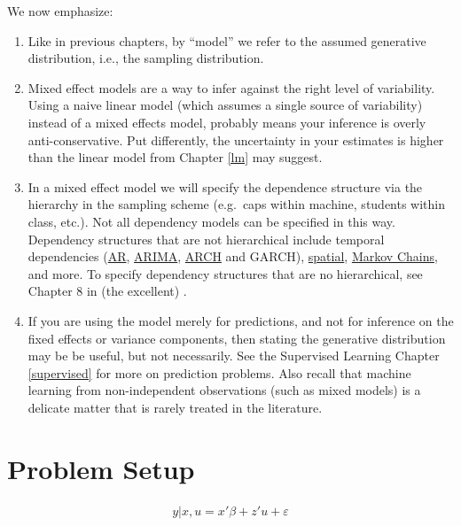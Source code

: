 \documentclass[]{book}
\theoremstyle{definition}
\theoremstyle{definition}
\theoremstyle{definition}
\theoremstyle{remark}
\begin{document}
We now emphasize:

\begin{enumerate}
\def\labelenumi{\arabic{enumi}.}
\item
  Like in previous chapters, by ``model'' we refer to the assumed
  generative distribution, i.e., the sampling distribution.
\item
  Mixed effect models are a way to infer against the right level of
  variability. Using a naive linear model (which assumes a single source
  of variability) instead of a mixed effects model, probably means your
  inference is overly anti-conservative. Put differently, the
  uncertainty in your estimates is higher than the linear model from
  Chapter \ref{lm} may suggest.
\item
  In a mixed effect model we will specify the dependence structure via
  the hierarchy in the sampling scheme (e.g.~caps within machine,
  students within class, etc.). Not all dependency models can be
  specified in this way. Dependency structures that are not hierarchical
  include temporal dependencies
  (\href{https://en.wikipedia.org/wiki/Autoregressive_model}{AR},
  \href{https://en.wikipedia.org/wiki/Autoregressive_integrated_moving_average}{ARIMA},
  \href{https://en.wikipedia.org/wiki/Autoregressive_conditional_heteroskedasticity}{ARCH}
  and GARCH),
  \href{https://en.wikipedia.org/wiki/Spatial_dependence}{spatial},
  \href{https://en.wikipedia.org/wiki/Markov_chain}{Markov Chains}, and
  more. To specify dependency structures that are no hierarchical, see
  Chapter 8 in (the excellent) \citet{weiss2005modeling}.
\item
  If you are using the model merely for predictions, and not for
  inference on the fixed effects or variance components, then stating
  the generative distribution may be be useful, but not necessarily. See
  the Supervised Learning Chapter \ref{supervised} for more on
  prediction problems. Also recall that machine learning from
  non-independent observations (such as mixed models) is a delicate
  matter that is rarely treated in the literature.
\end{enumerate}

\section{Problem Setup}\label{problem-setup-2}

\begin{align}
  y|x,u = x'\beta + z'u + \varepsilon
  \label{eq:mixed-model}  
\end{align}
\end{document}
